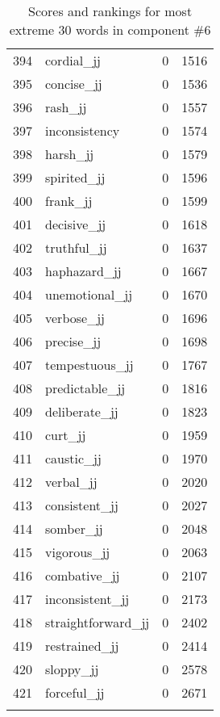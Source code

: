 \begin{longtable}[!htbp]{| rlr@{.}l |}
    394 & cordial\_jj & 0 & 1516 \\
    395 & concise\_jj & 0 & 1536 \\
    396 & rash\_jj & 0 & 1557 \\
    397 & inconsistency & 0 & 1574 \\
    398 & harsh\_jj & 0 & 1579 \\
    399 & spirited\_jj & 0 & 1596 \\
    400 & frank\_jj & 0 & 1599 \\
    401 & decisive\_jj & 0 & 1618 \\
    402 & truthful\_jj & 0 & 1637 \\
    403 & haphazard\_jj & 0 & 1667 \\
    404 & unemotional\_jj & 0 & 1670 \\
    405 & verbose\_jj & 0 & 1696 \\
    406 & precise\_jj & 0 & 1698 \\
    407 & tempestuous\_jj & 0 & 1767 \\
    408 & predictable\_jj & 0 & 1816 \\
    409 & deliberate\_jj & 0 & 1823 \\
    410 & curt\_jj & 0 & 1959 \\
    411 & caustic\_jj & 0 & 1970 \\
    412 & verbal\_jj & 0 & 2020 \\
    413 & consistent\_jj & 0 & 2027 \\
    414 & somber\_jj & 0 & 2048 \\
    415 & vigorous\_jj & 0 & 2063 \\
    416 & combative\_jj & 0 & 2107 \\
    417 & inconsistent\_jj & 0 & 2173 \\
    418 & straightforward\_jj & 0 & 2402 \\
    419 & restrained\_jj & 0 & 2414 \\
    420 & sloppy\_jj & 0 & 2578 \\
    421 & forceful\_jj & 0 & 2671 \\
    \hline
    \caption{Scores and rankings for most extreme 30 words in component \#6} \\
\end{longtable}
